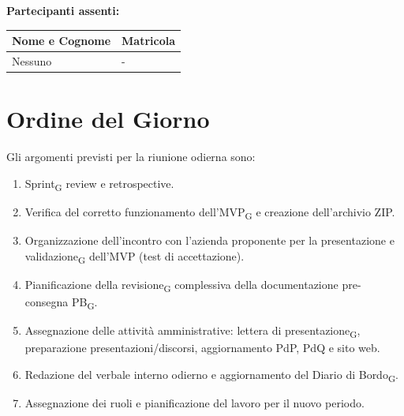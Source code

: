 \vspace{0.5cm}

\textbf{Partecipanti assenti:}

\begin{table}[ht]

\centering

\renewcommand{\arraystretch}{1.2}

\begin{tabularx}{\textwidth}{X l}

\toprule

\textbf{Nome e Cognome} & \textbf{Matricola} \\

\midrule

Nessuno & - \\

\bottomrule

\end{tabularx}

\end{table}



\section{Ordine del Giorno}

Gli argomenti previsti per la riunione odierna sono:

\begin{enumerate}

\item Sprint\textsubscript{G} review e retrospective.

\item Verifica del corretto funzionamento dell'MVP\textsubscript{G} e creazione dell'archivio ZIP.

\item Organizzazione dell'incontro con l'azienda proponente per la presentazione e validazione\textsubscript{G} dell'MVP (test di accettazione).

\item Pianificazione della revisione\textsubscript{G} complessiva della documentazione pre-consegna PB\textsubscript{G}.

\item Assegnazione delle attività amministrative: lettera di presentazione\textsubscript{G}, preparazione presentazioni/discorsi, aggiornamento PdP, PdQ e sito web.

\item Redazione del verbale interno odierno e aggiornamento del Diario di Bordo\textsubscript{G}.

\item Assegnazione dei ruoli e pianificazione del lavoro per il nuovo periodo.

\end{enumerate}


